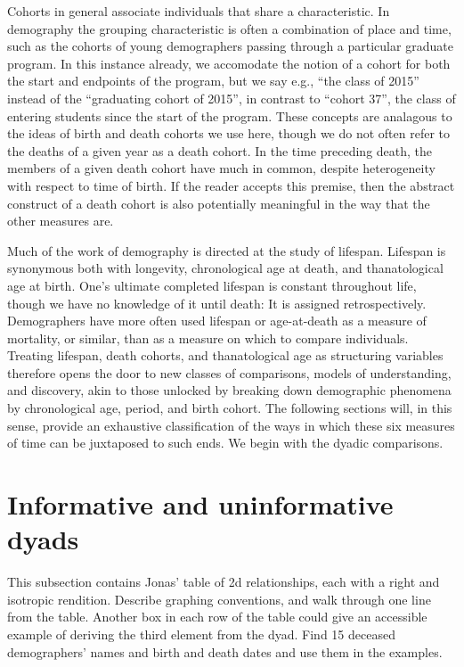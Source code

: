\documentclass[11pt,oneside,a4paper]{article} %
\begin{document}
Cohorts in general associate individuals that share a characteristic. In
demography the grouping characteristic is often a combination of place and time, such as
the cohorts of young demographers passing through a particular graduate program.
In this instance already, we accomodate the notion of a cohort for both the
start and endpoints of the program, but we say e.g., ``the class of 2015''
instead of the ``graduating cohort of 2015'', in contrast to ``cohort 37'', the
 class of entering students since the start of the program.
These concepts are analagous to the ideas of birth and death cohorts we use here, though we do not often refer to the
deaths of a given year as a death cohort. In the time preceding
death, the members of a given death cohort have much in common, despite
heterogeneity with respect to time of birth. If the reader accepts this premise,
then the abstract construct of a death cohort is also potentially meaningful in
the way that the other measures are.

Much of the work of demography is directed at the study of lifespan. Lifespan is
synonymous both with longevity, chronological age at death, and thanatological
age at birth. One's ultimate completed lifespan is constant throughout life,
though we have no knowledge of it until death: It is assigned retrospectively.
Demographers have more often used lifespan or age-at-death as a measure of mortality, or similar, than as a measure on which to compare individuals. Treating lifespan,
death cohorts, and thanatological age as structuring variables therefore opens
the door to new classes of comparisons, models of understanding, and discovery,
akin to those unlocked by breaking down demographic phenomena by chronological age,
period, and birth cohort.
The following sections will, in this sense, provide an exhaustive classification
of the ways in which these six measures of time can be juxtaposed to such ends.
We begin with the dyadic comparisons.

\FloatBarrier

\section*{Informative and uninformative dyads}
This subsection contains Jonas' table of 2d relationships, each with a right and
isotropic rendition. Describe graphing conventions, and walk through one line
from the table. Another box in each row of the table could give an accessible
example of deriving the third element from the dyad. Find 15 deceased
demographers' names and birth and death dates and use them in the examples.
\end{document}
